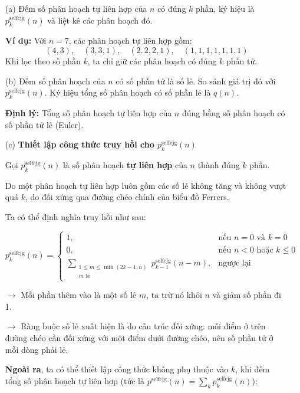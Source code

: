 \documentclass{article}
\begin{document}
	\begin{itemize}
		\item[(a)] Đếm số phân hoạch tự liên hợp của $n$ có đúng $k$ phần, ký hiệu là $p_k^{\text{selfcjg}}(n)$ và liệt kê các phân hoạch đó.
		
		\textbf{Ví dụ:} Với $n=7$, các phân hoạch tự liên hợp gồm: 
		\[
		(4,3),\quad (3,3,1),\quad (2,2,2,1),\quad (1,1,1,1,1,1,1)
		\]
		Khi lọc theo số phần $k$, ta chỉ giữ các phân hoạch có đúng $k$ phần tử.
		
		\item[(b)] Đếm số phân hoạch của $n$ có số phần tử là số lẻ. So sánh giá trị đó với $p_k^{\text{selfcjg}}(n)$.  
		Ký hiệu tổng số phân hoạch có số phần lẻ là $q(n)$.
		
		\textbf{Định lý:} Tổng số phân hoạch tự liên hợp của $n$ đúng bằng số phân hoạch có số phần tử lẻ (Euler).
		
		\item[(c)] \textbf{Thiết lập công thức truy hồi cho $p_k^{\text{selfcjg}}(n)$}
		
		Gọi $p_k^{\text{selfcjg}}(n)$ là số phân hoạch \textbf{tự liên hợp} của $n$ thành đúng $k$ phần.
		
		Do một phân hoạch tự liên hợp luôn gồm các số lẻ không tăng và không vượt quá $k$, do đối xứng qua đường chéo chính của biểu đồ Ferrers.
		
		Ta có thể định nghĩa truy hồi như sau:
		
		\[
		p_k^{\text{selfcjg}}(n) =
		\begin{cases}
			1, & \text{nếu } n = 0 \text{ và } k = 0 \\
			0, & \text{nếu } n < 0 \text{ hoặc } k \leq 0 \\
			\sum\limits_{\substack{1 \leq m \leq \min(2k-1,n)\\ m \text{ lẻ}}} p_{k-1}^{\text{selfcjg}}(n - m), & \text{ngược lại}
		\end{cases}
		\]
		
		
		$\rightarrow$ Mỗi phần thêm vào là một số lẻ $m$, ta trừ nó khỏi $n$ và giảm số phần đi 1.
		
		$\rightarrow$ Ràng buộc số lẻ xuất hiện là do cấu trúc đối xứng: mỗi điểm ở trên đường chéo cần đối xứng với một điểm dưới đường chéo, nên số phần tử ở mỗi dòng phải lẻ.
		
		\textbf{Ngoài ra}, ta có thể thiết lập công thức không phụ thuộc vào $k$, khi đếm tổng số phân hoạch tự liên hợp (tức là $p^{\text{selfcjg}}(n) = \sum_k p_k^{\text{selfcjg}}(n)$):
		

\end{itemize}
\end{document}
